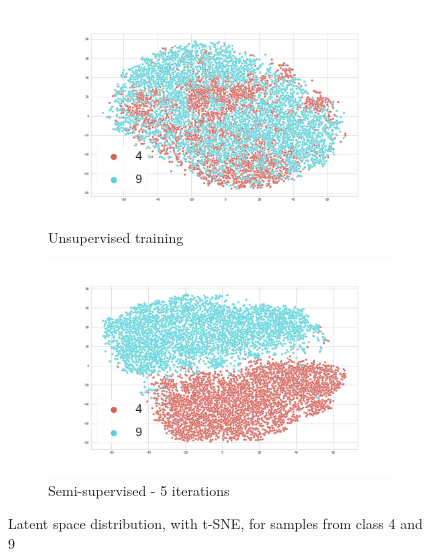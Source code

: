 \documentclass[runningheads]{llncs}
\begin{document}
\begin{figure}
\centering
\begin{subfigure}[t]{.4\textwidth}
  \centering
  \includegraphics[width=0.8\linewidth]{images/tsne_4_9_unsup.jpg}
  \caption{Unsupervised training}
  \label{tsne_un_4_9}
\end{subfigure}\hfill
\begin{subfigure}[t]{.4\textwidth}
  \centering
  \includegraphics[width=0.8\linewidth]{images/tsne_4_9_semi.jpg}
  \caption{Semi-supervised - 5 iterations}
  \label{tsne_semi_4_9}
\end{subfigure}
\caption{Latent space distribution, with t-SNE, for samples from class 4 and 9}
\label{tsne_4_9}
\end{figure}
\end{document}
